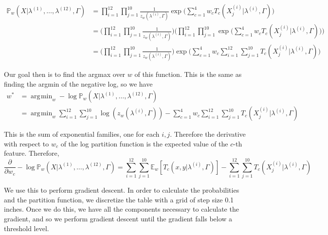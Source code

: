 \documentclass[12pt,letterpaper]{article}
\newcommand\prob{\mathbb{P}}
\newcommand\E{\mathbb{E}}
\DeclareMathOperator*{\argmin}{\arg\!\min}
\begin{document}
\begin{equation*}
\begin{split}
\prob_w(X|\lambda^{(1)}, \ldots, \lambda^{(12)}, \Gamma) &= \prod_{i = 1}^{12}\prod_{j = 1}^{10} \frac{1}{z_w(\lambda^{(i)}, \Gamma)}\exp\bigg(\sum_{c = 1}^4w_cT_c(X^{(i)}_j|\lambda^{(i)}, \Gamma)\bigg) \\
&= \bigg(\prod_{i = 1}^{12}\prod_{j = 1}^{10} \frac{1}{z_w(\lambda^{(i)}, \Gamma)}\bigg)\bigg(\prod_{i = 1}^{12}\prod_{j = 1}^{10}\exp\bigg(\sum_{c = 1}^4w_cT_c(X^{(i)}_j|\lambda^{(i)}, \Gamma)\bigg)\bigg) \\
&= \bigg(\prod_{i = 1}^{12}\prod_{j = 1}^{10} \frac{1}{z_w(\lambda^{(i)}, \Gamma)}\bigg)\exp\bigg(\sum_{c = 1}^4w_c\sum_{i = 1}^{12}\sum_{j = 1}^{10}T_c(X^{(i)}_j|\lambda^{(i)}, \Gamma)\bigg)
\end{split}
\end{equation*}

Our goal then is to find the argmax over $w$ of this function. This is the same as finding the argmin of the negative log, so we have
\begin{equation*}
\begin{split}
w^* &= \argmin_w -\log\prob_w(X|\lambda^{(1)}, \ldots, \lambda^{(12)}, \Gamma) \\
&= \argmin_w \sum_{i = 1}^{12}\sum_{j = 1}^{10}\log(z_w(\lambda^{(i)}, \Gamma)) - \sum_{c = 1}^4w_c\sum_{i = 1}^{12}\sum_{j = 1}^{10}T_c(X^{(i)}_j|\lambda^{(i)}, \Gamma)
\end{split}
\end{equation*}

This is the sum of exponential families, one for each $i, j$. Therefore the derivative with respect to $w_c$ of the log partition function is the expected value of the $c$-th feature. Therefore, 
\[
\frac{\partial}{\partial w_c} -\log\prob_w(X|\lambda^{(1)}, \ldots, \lambda^{(12)}, \Gamma) = \sum_{i = 1}^{12}\sum_{j = 1}^{10} \E_w[T_c(x, y|\lambda^{(i)}, \Gamma)] - \sum_{i = 1}^{12}\sum_{j = 1}^{10}T_c(X^{(i)}_j|\lambda^{(i)}, \Gamma)
\]

We use this to perform gradient descent. In order to calculate the probabilities and the partition function, we discretize the table with a grid of step size 0.1 inches. Once we do this, we have all the components necessary to calculate the gradient, and so we perform gradient descent until the gradient falls below a threshold level.
\end{document}
